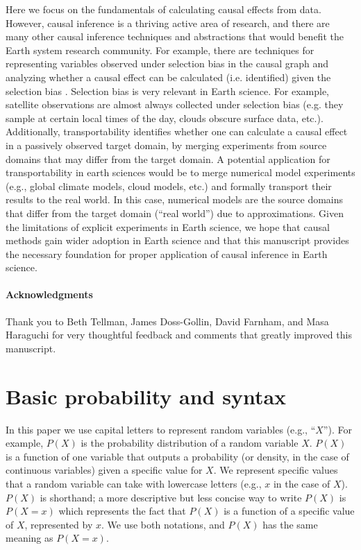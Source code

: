 \documentclass[12pt]{article}
\begin{document}
Here we focus on the fundamentals of calculating causal effects from
data. However, causal inference is a thriving active area of research,
and there are many other causal inference techniques and abstractions
that would benefit the Earth system research community. For example,
there are techniques for representing variables observed under
selection bias in the causal graph and analyzing whether a causal
effect can be calculated (i.e. identified) given the selection bias
\citep[e.g.,][]{bareinboim2014recovering}. Selection bias is very
relevant in Earth science. For example, satellite observations are
almost always collected under selection bias (e.g. they sample at
certain local times of the day, clouds obscure surface data,
etc.). Additionally, transportability
\citep[e.g.,][]{bareinboim2012transportability} identifies whether one
can calculate a causal effect in a passively observed target domain,
by merging experiments from source domains that may differ from the
target domain. A potential application for transportability in earth
sciences would be to merge numerical model experiments (e.g., global
climate models, cloud models, etc.) and formally transport their
results to the real world. In this case, numerical models are the
source domains that differ from the target domain (``real world'') due
to approximations. Given the limitations of explicit experiments in
Earth science, we hope that causal methods gain wider adoption in
Earth science and that this manuscript provides the necessary
foundation for proper application of causal inference in Earth
science.

\paragraph{Acknowledgments} Thank you to Beth Tellman, James
Doss-Gollin, David Farnham, and Masa Haraguchi for very thoughtful
feedback and comments that greatly improved this manuscript.




\appendix
\section{Basic probability and syntax}
\label{prob-theory}

In this paper we use capital letters to represent random variables
(e.g., ``$X$''). For example, $P(X)$ is the probability distribution
of a random variable $X$. $P(X)$ is a function of one variable that
outputs a probability (or density, in the case of continuous
variables) given a specific value for $X$. We represent specific
values that a random variable can take with lowercase letters (e.g.,
$x$ in the case of $X$). $P(X)$ is shorthand; a more descriptive but
less concise way to write $P(X)$ is $P(X=x)$ which represents the fact
that $P(X)$ is a function of a specific value of $X$, represented by
$x$. We use both notations, and $P(X)$ has the same meaning as
$P(X=x)$.
\end{document}

